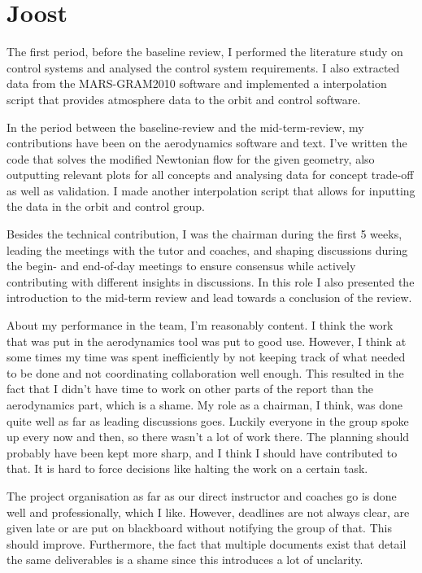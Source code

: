 \section{Joost}

The first period, before the baseline review, I performed the literature study on control systems and analysed the control system requirements. I also extracted data from the MARS-GRAM2010 software and implemented a interpolation script that provides atmosphere data to the orbit and control software.

In the period between the baseline-review and the mid-term-review, my contributions have been on the aerodynamics software and text. I've written the code that solves the modified Newtonian flow for the given geometry, also outputting relevant plots for all concepts and analysing data for concept trade-off as well as validation. I made another interpolation script that allows for inputting the data in the orbit and control group.

Besides the technical contribution, I was the chairman during the first 5 weeks, leading the meetings with the tutor and coaches, and shaping discussions during the begin- and end-of-day meetings to ensure consensus while actively contributing with different insights in discussions. In this role I also presented the introduction to the mid-term review and lead towards a conclusion of the review.

About my performance in the team, I'm reasonably content. I think the work that was put in the aerodynamics tool was put to good use. However, I think at some times my time was spent inefficiently by not keeping track of what needed to be done and not coordinating collaboration well enough. This resulted in the fact that I didn't have time to work on other parts of the report than the aerodynamics part, which is a shame. My role as a chairman, I think, was done quite well as far as leading discussions goes. Luckily everyone in the group spoke up every now and then, so there wasn't a lot of work there. The planning should probably have been kept more sharp, and I think I should have contributed to that. It is hard to force decisions like halting the work on a certain task.

The project organisation as far as our direct instructor and coaches go is done well and professionally, which I like. However, deadlines are not always clear, are given late or are put on blackboard without notifying the group of that. This should improve. Furthermore, the fact that multiple documents exist that detail the same deliverables is a shame since this introduces a lot of unclarity.
